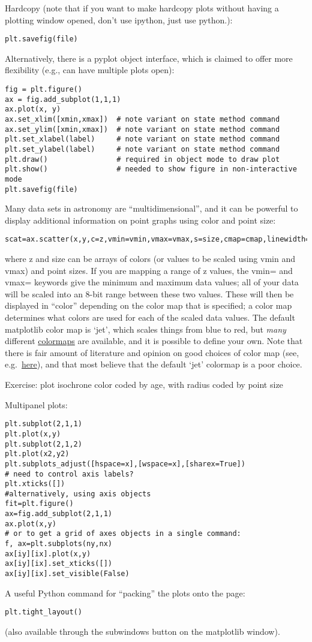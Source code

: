 \documentclass{article}
\begin{document}
Hardcopy (note that if you want to make hardcopy plots without having
a plotting window opened, don't use ipython, just use python.):
\begin{verbatim}
plt.savefig(file)
\end{verbatim}
Alternatively, there is a pyplot object interface, which is claimed to
offer more flexibility (e.g., can have multiple plots open):
\begin{verbatim}
fig = plt.figure()
ax = fig.add_subplot(1,1,1)
ax.plot(x, y)
ax.set_xlim([xmin,xmax])  # note variant on state method command
ax.set_ylim([xmin,xmax])  # note variant on state method command
plt.set_xlabel(label)     # note variant on state method command
plt.set_ylabel(label)     # note variant on state method command
plt.draw()                # required in object mode to draw plot
plt.show()                # needed to show figure in non-interactive
mode
plt.savefig(file)
\end{verbatim}
Many data sets in astronomy are ``multidimensional'', and it can be
powerful to display additional information on point graphs using color
and point size:
\begin{verbatim}
scat=ax.scatter(x,y,c=z,vmin=vmin,vmax=vmax,s=size,cmap=cmap,linewidth=linewidth)
\end{verbatim}
where z and size can be arrays of colors (or values to be scaled using
vmin and vmax) and point sizes. If you are mapping a range of z
values, the vmin= and vmax= keywords give the minimum and maximum data
values; all of your data will be scaled into an 8-bit range between
these two values. These will then be displayed in ``color'' depending
on the color map that is specified; a color map determines what colors
are used for each of the scaled data values. The default matplotlib
color map is `jet', which scales things from blue to red, but
\emph{many} different \href{http://matplotlib.org/users/colormaps.html}
{colormaps} are available, and it is possible to define your
own. Note that there is fair amount of literature and opinion on good
choices of color map (see, e.g.\
\href{https://jakevdp.github.io/blog/2014/10/16/how-bad-is-your-colormap/}
{here}), and that most believe that the
default `jet' colormap is a poor choice.

Exercise: plot isochrone color coded by age, with radius coded by
point size

Multipanel plots:
\begin{verbatim}
plt.subplot(2,1,1)
plt.plot(x,y)
plt.subplot(2,1,2)
plt.plot(x2,y2)
plt.subplots_adjust([hspace=x],[wspace=x],[sharex=True])
# need to control axis labels?
plt.xticks([])
#alternatively, using axis objects
fit=plt.figure()
ax=fig.add_subplot(2,1,1)
ax.plot(x,y)
# or to get a grid of axes objects in a single command:
f, ax=plt.subplots(ny,nx)
ax[iy][ix].plot(x,y)
ax[iy][ix].set_xticks([])
ax[iy][ix].set_visible(False)
\end{verbatim}
A useful Python command for ``packing'' the plots onto the page:
\begin{verbatim}
plt.tight_layout()
\end{verbatim}
(also available through the subwindows button on the matplotlib
window).
\end{document}
